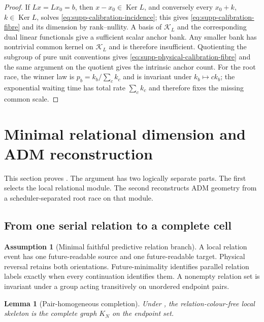 \documentclass[11pt]{article}
\newtheorem{lemma}[lemma]{Lemma}
\theoremstyle{definition}
\newtheorem{assumption}[assumption]{Assumption}
\theoremstyle{remark}
\newcommand{\Ker}{\operatorname{Ker}}
\begin{document}
\begin{proof}
If $Lx=Lx_0=b$, then $x-x_0\in\Ker L$, and conversely every
$x_0+k$, $k\in\Ker L$, solves \eqref{eq:supp-calibration-incidence}; this gives
\eqref{eq:supp-calibration-fibre} and its dimension by rank--nullity.  A basis
of $\mathcal K_L$ and the corresponding dual linear functionals give a
sufficient scalar anchor bank.  Any smaller bank has nontrivial common kernel
on $\mathcal K_L$ and is therefore insufficient.  Quotienting the subgroup of
pure unit conventions gives
\eqref{eq:supp-physical-calibration-fibre} and the same argument on the quotient
gives the intrinsic anchor count.  For the root race, the winner law is
$p_b=k_b/\sum_ck_c$ and is invariant under $k_b\mapsto ck_b$; the exponential
waiting time has total rate $\sum_ck_c$ and therefore fixes the missing common
scale.
\end{proof}

\section{Minimal relational dimension and ADM reconstruction}
\label{supp:dimension-adm}

This section proves .  The argument has two logically separate
parts.  The first selects the local relational module.  The second reconstructs
ADM geometry from a scheduler-separated root race on that module.

\subsection{From one serial relation to a complete cell}

\begin{assumption}[Minimal faithful predictive relation branch]
\label{ass:supp-relational-branch}
A local relation event has one future-readable source and one future-readable
target.  Physical reversal retains both orientations.  Future-minimality
identifies parallel relation labels exactly when every continuation identifies
them.  A nonempty relation set is invariant under a group acting transitively
on unordered endpoint pairs.
\end{assumption}

\begin{lemma}[Pair-homogeneous completion]
\label{lem:supp-pair-completion}
Under , the relation-colour-free local skeleton
is the complete graph $K_N$ on the endpoint set.
\end{lemma}
\end{document}
